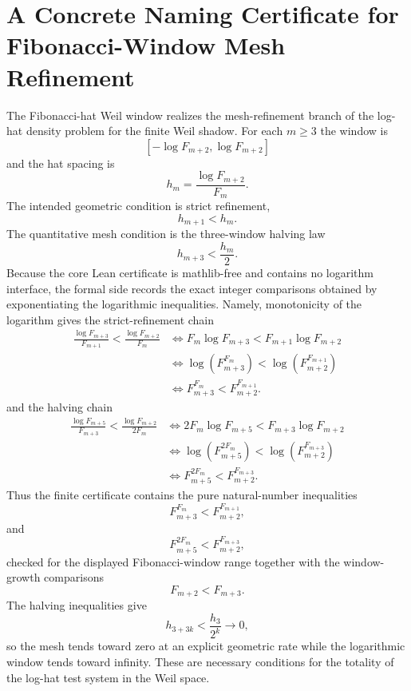 \chapter{A Concrete Naming Certificate for Fibonacci-Window Mesh Refinement}
\label{ch:concrete-instances-fibonacci-window-mesh-refinement-namecert}

The Fibonacci-hat Weil window realizes the mesh-refinement branch of the log-hat density problem for the finite Weil shadow. For each $m\geq 3$ the window is
$$
[-\log F_{m+2},\log F_{m+2}]
$$
and the hat spacing is
$$
h_m=\frac{\log F_{m+2}}{F_m}.
$$
The intended geometric condition is strict refinement,
$$
h_{m+1}<h_m.
$$
The quantitative mesh condition is the three-window halving law
$$
h_{m+3}<\frac{h_m}{2}.
$$
Because the core Lean certificate is mathlib-free and contains no logarithm interface, the formal side records the exact integer comparisons obtained by exponentiating the logarithmic inequalities. Namely, monotonicity of the logarithm gives the strict-refinement chain
$$
\begin{aligned}
\frac{\log F_{m+3}}{F_{m+1}}<\frac{\log F_{m+2}}{F_m}
&\Longleftrightarrow F_m\log F_{m+3}<F_{m+1}\log F_{m+2}\\
&\Longleftrightarrow \log(F_{m+3}^{F_m})<\log(F_{m+2}^{F_{m+1}})\\
&\Longleftrightarrow F_{m+3}^{F_m}<F_{m+2}^{F_{m+1}} .
\end{aligned}
$$
and the halving chain
$$
\begin{aligned}
\frac{\log F_{m+5}}{F_{m+3}}<\frac{\log F_{m+2}}{2F_m}
&\Longleftrightarrow 2F_m\log F_{m+5}<F_{m+3}\log F_{m+2}\\
&\Longleftrightarrow \log(F_{m+5}^{2F_m})<\log(F_{m+2}^{F_{m+3}})\\
&\Longleftrightarrow F_{m+5}^{2F_m}<F_{m+2}^{F_{m+3}} .
\end{aligned}
$$
Thus the finite certificate contains the pure natural-number inequalities
$$
F_{m+3}^{F_m}<F_{m+2}^{F_{m+1}},
$$
and
$$
F_{m+5}^{2F_m}<F_{m+2}^{F_{m+3}},
$$
checked for the displayed Fibonacci-window range together with the window-growth comparisons
$$
F_{m+2}<F_{m+3}.
$$
The halving inequalities give
$$
h_{3+3k}<\frac{h_3}{2^k}\to 0,
$$
so the mesh tends toward zero at an explicit geometric rate while the logarithmic window tends toward infinity. These are necessary conditions for the totality of the log-hat test system in the Weil space.

